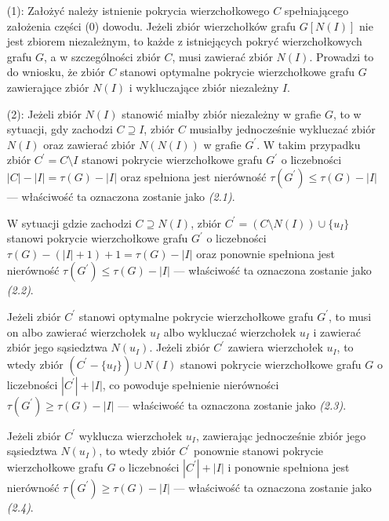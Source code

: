 {\begin{bproof}
\begin{itemize}
      W sytuacji gdy $I = X$, to ponieważ $Y \neq \emptyset$, tak jak w poprzednim przypadku spełniona jest nierówność $|Y|\geq|I|-|X|+1$.
      Ponieważ zbiór $I$ jest niezależny w grafie $G$, zastąpienie zbioru $Y \cup X$ zbiorem $N(I)$ w pokryciu wierzchołkowym $C$ owocuje pokryciem wierzchołkowym $C^\prime$ grafu $G$ o liczebności $|C^\prime| \leq |C|$.
      Wobec tego toku rozumowania łatwo zauważyć, że zbiór $C^\prime$ stanowi pokrycie wierzchołkowe grafu $G$ o najmniejszej liczebności, które zawiera zbiór $N(I)$ oraz wyklucza zbiór niezależny $I$.
      \item[(1):] Założyć należy istnienie pokrycia wierzchołkowego $C$ spełniającego założenia części (0) dowodu.
      Jeżeli zbiór wierzchołków grafu $G[N(I)]$ nie jest zbiorem niezależnym, to każde z istniejących pokryć wierzchołkowych grafu $G$, a w szczególności zbiór $C$, musi zawierać zbiór $N(I)$.
      Prowadzi to do wniosku, że zbiór $C$ stanowi optymalne pokrycie wierzchołkowe grafu $G$ zawierające zbiór $N(I)$ i wykluczające zbiór niezależny $I$.
      \item[(2):] Jeżeli zbiór $N(I)$ stanowić miałby zbiór niezależny w grafie $G$, to w sytuacji, gdy zachodzi $C \supseteq I$, zbiór $C$ musiałby jednocześnie wykluczać zbiór $N(I)$ oraz zawierać zbiór $N(N(I))$ w grafie $G^\prime$.
      W takim przypadku zbiór $C^\prime=C \setminus I$ stanowi pokrycie wierzchołkowe grafu $G^\prime$ o liczebności $|C|-|I|=\tau(G)-|I|$ oraz spełniona jest nierówność $\tau(G^\prime)\leq\tau(G)-|I|$ --- właściwość ta oznaczona zostanie jako \textit{(2.1)}.

      W sytuacji gdzie zachodzi $C \supseteq N(I)$, zbiór $C^\prime=(C \setminus N(I))\cup \{u_I\}$ stanowi pokrycie wierzchołkowe grafu $G^\prime$ o liczebności $\tau(G)-(|I|+1)+1=\tau(G)-|I|$ oraz ponownie spełniona jest nierówność $\tau(G^\prime)\leq\tau(G)-|I|$ --- właściwość ta oznaczona zostanie jako \textit{(2.2)}.

      Jeżeli zbiór $C^\prime$ stanowi optymalne pokrycie wierzchołkowe grafu $G^\prime$, to musi on albo zawierać wierzchołek $u_I$ albo wykluczać wierzchołek $u_I$ i zawierać zbiór jego sąsiedztwa $N(u_I)$.
      Jeżeli zbiór $C^\prime$ zawiera wierzchołek $u_I$, to wtedy zbiór $(C^\prime - \{u_I\}) \cup N(I)$ stanowi pokrycie wierzchołkowe grafu $G$ o liczebności $|C^\prime|+|I|$, co powoduje spełnienie nierówności $\tau(G^\prime)\geq \tau(G)-|I|$ --- właściwość ta oznaczona zostanie jako \textit{(2.3)}.

      Jeżeli zbiór $C^\prime$ wyklucza wierzchołek $u_I$, zawierając jednocześnie zbiór jego sąsiedztwa $N(u_I)$, to wtedy zbiór $C^\prime$ ponownie stanowi pokrycie wierzchołkowe grafu $G$ o liczebności $|C^\prime|+|I|$ i ponownie spełniona jest nierówność $\tau(G^\prime)\geq \tau(G)-|I|$ --- właściwość ta oznaczona zostanie jako \textit{(2.4)}.


\end{itemize}
\end{bproof}}
